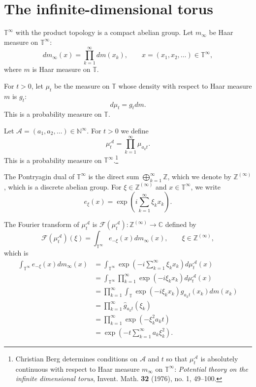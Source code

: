 \documentclass{article}
\begin{document}
\section{The infinite-dimensional torus}
$\mathbb{T}^\infty$ with the product topology is a compact abelian group. Let $m_\infty$ be Haar measure on $\mathbb{T}^\infty$:
\[
dm_\infty(x) = \prod_{k=1}^\infty dm(x_k),\qquad x=(x_1,x_2,\ldots) \in \mathbb{T}^\infty,
\]
where $m$ is Haar measure on $\mathbb{T}$.

For $t>0$, let $\mu_t$ be the measure on $\mathbb{T}$ whose density with respect to Haar measure $m$
is $g_t$:
\[
d\mu_t = g_t  dm.
\]
This is a probability measure on $\mathbb{T}$.

Let $\mathscr{A}=(a_1,a_2,\ldots) \in \mathbb{N}^\infty$. For $t>0$ we define
\[
\mu_t^{\mathscr{A}} = \prod_{k=1}^\infty \mu_{a_k t}.
\]
This is a probability measure on $\mathbb{T}^\infty$.\footnote{Christian Berg
determines conditions on $\mathscr{A}$ and $t$ so that 
$\mu_t^{\mathscr{A}}$ is absolutely continuous with respect to 
Haar measure $m_\infty$ on $\mathbb{T}^\infty$:
{\em Potential theory on the infinite dimensional torus}, Invent. Math. \textbf{32} (1976), no. 1, 49--100.}


The Pontryagin dual of $\mathbb{T}^\infty$ is the direct sum $\bigoplus_{k=1}^\infty \mathbb{Z}$, which we denote
by $\mathbb{Z}^{(\infty)}$, which is a discrete abelian group. For $\xi \in \mathbb{Z}^{(\infty)}$ and $x \in \mathbb{T}^\infty$, we write
\[
e_\xi(x) = \exp\left(i\sum_{k=1}^\infty \xi_k x_k \right).
\]

The Fourier transform of $\mu_t^{\mathscr{A}}$ is
$\mathscr{F}(\mu_t^{\mathscr{A}}):\mathbb{Z}^{(\infty)} \to \mathbb{C}$
defined by
\[
\mathscr{F}(\mu_t^{\mathscr{A}})(\xi)
=\int_{\mathbb{T}^\infty} e_{-\xi}(x) dm_\infty(x), \qquad
\xi \in \mathbb{Z}^{(\infty)},
\]
which is
\begin{align*}
\int_{\mathbb{T}^\infty} e_{-\xi}(x) dm_\infty(x)&=
\int_{\mathbb{T}^\infty} \exp\left(-i\sum_{k=1}^\infty \xi_k x_k \right) d\mu_t^{\mathscr{A}}(x)\\
&=\int_{\mathbb{T}^\infty} \prod_{k=1}^\infty \exp(-i\xi_k x_k) d\mu_t^{\mathscr{A}}(x)\\
&=\prod_{k=1}^\infty \int_{\mathbb{T}}  \exp(-i\xi_k x_k) g_{a_k t}(x_k) dm(x_k)\\
&=\prod_{k=1}^\infty \hat{g}_{a_k t}(\xi_k)\\
&=\prod_{k=1}^\infty \exp(-\xi_k^2 a_k t)\\
&=\exp\left( -t \sum_{k=1}^\infty a_k \xi_k^2 \right).
\end{align*}
\end{document}
